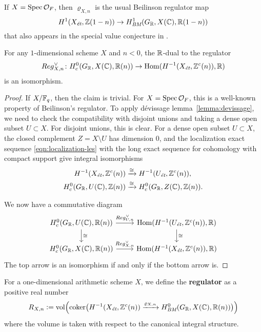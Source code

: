 \documentclass{article}
\numberwithin{equation}{section}
\begin{document}
\begin{remark}
  If $X = \Spec \mathcal{O}_F$, then $\varrho_{X,n}$ is the usual Beilinson
  regulator map
  \[ H^1 (X_\et, \ZZ (1-n)) \to H^1_\BM (G_\RR, X(\CC), \RR(1-n)) \]
  that also appears in the special value conjecture in
  \cite[\S 5.8.3]{Flach-Morin-2018}.
\end{remark}

\begin{lemma}
  \label{lemma:regulator-isomorphism}
  For any $1$-dimensional scheme $X$ and $n < 0$, the $\RR$-dual to the
  regulator
  \[ Reg_{X,n}^\vee\colon H^0_c (G_\RR, X(\CC), \RR(n)) \to
    \Hom (H^{-1} (X_\et, \ZZ^c (n)), \RR) \]
  is an isomorphism.

  \begin{proof}
    If $X/\FF_q$, then the claim is trivial. For $X = \Spec \mathcal{O}_F$, this
    is a well-known property of Beilinson's regulator. To apply dévissage
    lemma~\ref{lemma:devissage}, we need to check the compatibility with
    disjoint unions and taking a dense open subset $U \subset X$. For disjoint
    unions, this is clear. For a dense open subset $U \subset X$, the closed
    complement $Z = X\setminus U$ has dimension $0$, and the localization exact
    sequence \eqref{eqn:localization-les} with the long exact sequence for
    cohomology with compact support give integral isomorphisms
    \begin{align*}
      H^{-1} (X_\et, \ZZ^c (n)) & \xrightarrow{\cong} H^{-1} (U_\et, \ZZ^c (n)), \\
      H^0_c (G_\RR, U(\CC), \ZZ(n)) & \xrightarrow{\cong} H^0_c (G_\RR, Z(\CC), \ZZ(n)).
    \end{align*}

    We now have a commutative diagram
    \[ \begin{tikzcd}
        H^0_c (G_\RR, U(\CC), \RR(n)) \ar{r}{Reg_{U,n}^\vee} \ar{d}{\cong} &
        \Hom (H^{-1} (U_\et, \ZZ^c (n)), \RR) \ar{d}{\cong} \\
        H^0_c (G_\RR, X(\CC), \RR(n)) \ar{r}{Reg_{X,n}^\vee} &
        \Hom (H^{-1} (X_\et, \ZZ^c (n)), \RR)
      \end{tikzcd} \]
    The top arrow is an isomorphism if and only if the bottom arrow is.
  \end{proof}
\end{lemma}

\begin{definition}
  \label{dfn:regulator}
  For a one-dimensional arithmetic scheme $X$, we define the \textbf{regulator}
  as a positive real number
  \[ R_{X,n} \dfn \vol \Bigl(\coker \bigl(
    H^{-1} (X_\et, \ZZ^c (n)) \xrightarrow{\varrho_{X,n}}
    H^0_\BM (G_\RR, X(\CC), \RR(n))
    \bigr)\Bigr) \]
  where the volume is taken with respect to the canonical integral structure.
\end{definition}
\end{document}

